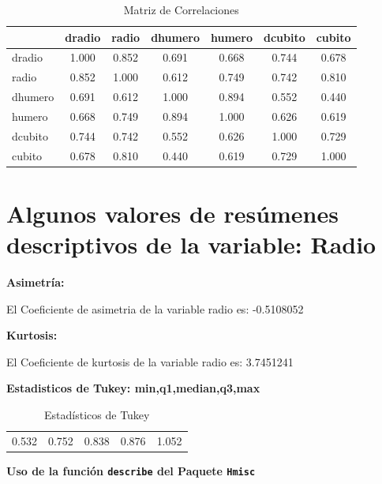 \documentclass[12pt,a4paper,]{book}
\numberwithin{dummy}{section}
\theoremstyle{ocrenumbox}
\theoremstyle{ocrenumbox}
\theoremstyle{ocrenumbox}
\theoremstyle{ocrenumbox}
\theoremstyle{ocrenum}
\begin{document}
\begingroup\fontsize{8}{10}\selectfont

\begin{longtable}[t]{lcccccc}
\caption{\label{tab:unnamed-chunk-5}Matriz de Correlaciones}\\
\toprule
 & dradio & radio & dhumero & humero & dcubito & cubito\\
\midrule
dradio & 1.000 & 0.852 & 0.691 & 0.668 & 0.744 & 0.678\\
radio & 0.852 & 1.000 & 0.612 & 0.749 & 0.742 & 0.810\\
dhumero & 0.691 & 0.612 & 1.000 & 0.894 & 0.552 & 0.440\\
humero & 0.668 & 0.749 & 0.894 & 1.000 & 0.626 & 0.619\\
dcubito & 0.744 & 0.742 & 0.552 & 0.626 & 1.000 & 0.729\\
\addlinespace
cubito & 0.678 & 0.810 & 0.440 & 0.619 & 0.729 & 1.000\\
\bottomrule
\end{longtable}
\endgroup{}

\hypertarget{algunos-valores-de-resuxfamenes-descriptivos-de-la-variable-radio}{%
\section{Algunos valores de resúmenes descriptivos de la variable:
Radio}\label{algunos-valores-de-resuxfamenes-descriptivos-de-la-variable-radio}}

\textbf{Asimetría:}

El Coeficiente de asimetria de la variable radio es: -0.5108052

\textbf{Kurtosis:}

El Coeficiente de kurtosis de la variable radio es: 3.7451241

\textbf{Estadisticos de Tukey: min,q1,median,q3,max}

\begingroup\fontsize{8}{10}\selectfont

\begin{longtable}[t]{ccccc}
\caption{\label{tab:unnamed-chunk-6}Estadísticos de Tukey}\\
\toprule
 &  &  &  & \\
\midrule
0.532 & 0.752 & 0.838 & 0.876 & 1.052\\
\bottomrule
\end{longtable}
\endgroup{}

\textbf{Uso de la función \texttt{describe} del Paquete \texttt{Hmisc}}

\begingroup\fontsize{8}{10}\selectfont
\end{document}
